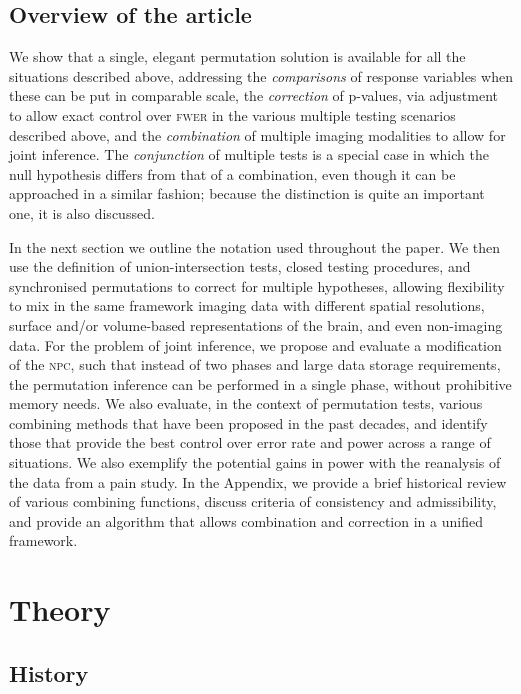 \subsection{Overview of the article}

We show that a single, elegant permutation solution is available for all the situations described above, addressing the \emph{comparisons} of response variables when these can be put in comparable scale, the \emph{correction} of p-values, via adjustment to allow exact control over \textsc{fwer} in the various multiple testing scenarios described above, and the \emph{combination} of multiple imaging modalities to allow for joint inference. The \emph{conjunction} of multiple tests is a special case in which the null hypothesis differs from that of a combination, even though it can be approached in a similar fashion; because the distinction is quite an important one, it is also discussed.

In the next section we outline the notation used throughout the paper. We then use the definition of union-intersection tests, closed testing procedures, and synchronised permutations to correct for multiple hypotheses, allowing flexibility to mix in the same framework imaging data with different spatial resolutions, surface and/or volume-based representations of the brain, and even non-imaging data. For the problem of joint inference, we propose and evaluate a modification of the \textsc{npc}, such that instead of two phases and large data storage requirements, the permutation inference can be performed in a single phase, without prohibitive memory needs. We also evaluate, in the context of permutation tests, various combining methods that have been proposed in the past decades, and identify those that provide the best control over error rate and power across a range of situations. We also exemplify the potential gains in power with the reanalysis of the data from a pain study. In the Appendix, we provide a brief historical review of various combining functions, discuss criteria of consistency and admissibility, and provide an algorithm that allows combination and correction in a unified framework.

\section{Theory}

\subsection{History}

